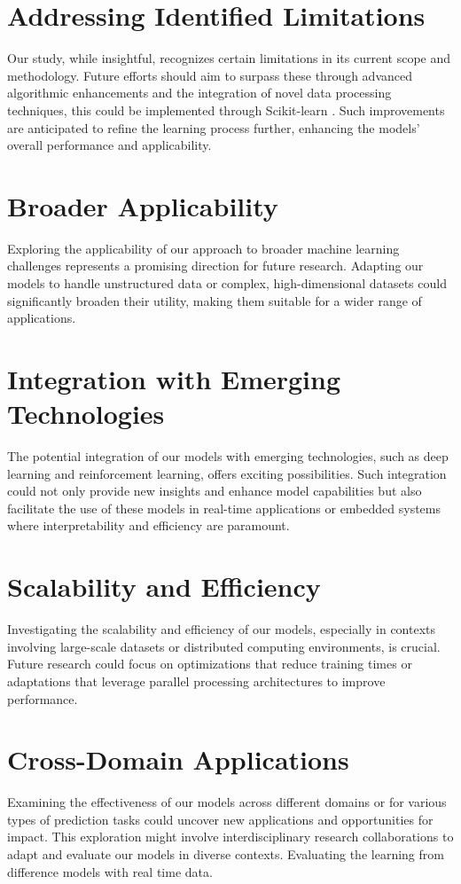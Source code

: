 \documentclass[a4paper, 12pt]{report}
\begin{document}
\section{Addressing Identified Limitations}
Our study, while insightful, recognizes certain limitations in its current scope and methodology. 
Future efforts should aim to surpass these through advanced algorithmic enhancements and the integration of novel data processing techniques, this could be implemented through 
Scikit-learn \cite{scikit}. Such improvements are anticipated to refine the learning process further, enhancing the models' overall performance and applicability.

\section{Broader Applicability}
Exploring the applicability of our approach to broader machine learning challenges represents a promising direction for future research. 
Adapting our models to handle unstructured data or complex, high-dimensional datasets could significantly broaden their utility, making them suitable for a wider range of applications.

\section{Integration with Emerging Technologies}
The potential integration of our models with emerging technologies, such as deep learning and reinforcement learning, offers exciting possibilities. 
Such integration could not only provide new insights and enhance model capabilities but also facilitate the use of these models in real-time applications or 
embedded systems where interpretability and efficiency are paramount.

\section{Scalability and Efficiency}
Investigating the scalability and efficiency of our models, especially in contexts involving large-scale datasets or distributed computing environments, is crucial. 
Future research could focus on optimizations that reduce training times or adaptations that leverage parallel processing architectures to improve performance.

\section{Cross-Domain Applications}
Examining the effectiveness of our models across different domains or for various types of prediction tasks could uncover new applications and opportunities for impact. 
This exploration might involve interdisciplinary research collaborations to adapt and evaluate our models in diverse contexts. 
Evaluating the learning from difference models with real time data.
\end{document}
